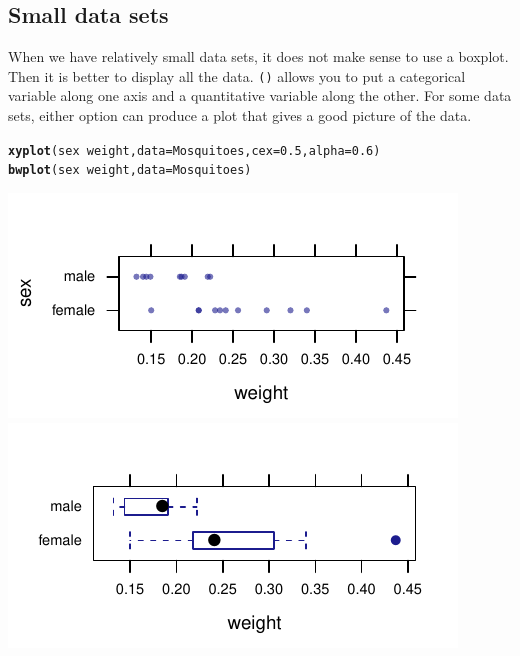 \documentclass[twoside]{book}\usepackage[]{graphicx}\usepackage[]{xcolor}
\makeatletter
\def\maxwidth{ %
  \ifdim\Gin@nat@width>\linewidth
    \linewidth
  \else
    \Gin@nat@width
  \fi
}
\newcommand{\hlnum}[1]{\textcolor[rgb]{0.686,0.059,0.569}{#1}}%
\newcommand{\hlopt}[1]{\textcolor[rgb]{0,0,0}{#1}}%
\newcommand{\hlstd}[1]{\textcolor[rgb]{0.345,0.345,0.345}{#1}}%
\newcommand{\hlkwc}[1]{\textcolor[rgb]{0.333,0.667,0.333}{#1}}%
\newcommand{\hlkwd}[1]{\textcolor[rgb]{0.737,0.353,0.396}{\textbf{#1}}}%
\newenvironment{kframe}{%
 \def\at@end@of@kframe{}%
 \ifinner\ifhmode%
  \def\at@end@of@kframe{\end{minipage}}%
  \begin{minipage}{\columnwidth}%
 \fi\fi%
 \def\FrameCommand##1{\hskip\@totalleftmargin \hskip-\fboxsep
 \colorbox{shadecolor}{##1}\hskip-\fboxsep
     \hskip-\linewidth \hskip-\@totalleftmargin \hskip\columnwidth}%
 \MakeFramed {\advance\hsize-\width
   \@totalleftmargin\z@ \linewidth\hsize
   \@setminipage}}%
 {\par\unskip\endMakeFramed%
 \at@end@of@kframe}
\newenvironment{knitrout}{}{} %
\newcommand{\Rindex}[1]{\index{\texttt{#1}}}
\newcommand{\function}[1]{{\color{purple!75!blue}\texttt{\StrSubstitute{#1}{()}{}()}}\Rindex{#1}}
\makeatother
\begin{document}
\subsection{Small data sets}
When we have relatively small data sets, it does not make sense to use a boxplot.  Then it is better to 
display all the data.  \function{xyplot()} allows you to put a categorical variable along one axis and a 
quantitative variable along the other.  
For some data sets, either option can produce a plot that gives a good picture
of the data.
\begin{knitrout}
\color{fgcolor}\begin{kframe}
\begin{alltt}
\hlkwd{xyplot}\hlstd{(sex} \hlopt{~} \hlstd{weight,} \hlkwc{data} \hlstd{= Mosquitoes,} \hlkwc{cex} \hlstd{=} \hlnum{0.5}\hlstd{,} \hlkwc{alpha} \hlstd{=} \hlnum{0.6}\hlstd{)}
\hlkwd{bwplot}\hlstd{(sex} \hlopt{~} \hlstd{weight,} \hlkwc{data} \hlstd{= Mosquitoes)}
\end{alltt}
\end{kframe}

{\centering \includegraphics[width=\maxwidth]{figures/fig-xyplot-quant-by-cat-1} 
\includegraphics[width=\maxwidth]{figures/fig-xyplot-quant-by-cat-2} 

}



\end{knitrout}
\end{document}
